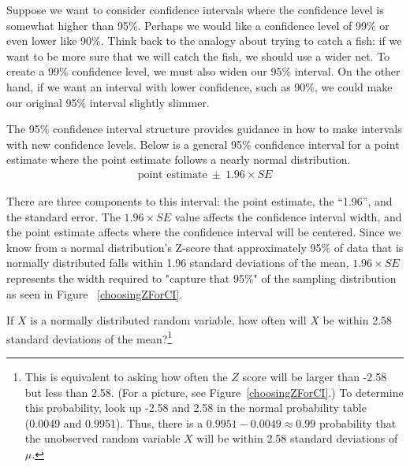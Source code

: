 
Suppose we want to consider confidence intervals where the confidence level is somewhat higher than 95\%. Perhaps we would like a confidence level of 99\% or even lower like 90\%. Think back to the analogy about trying to catch a fish: if we want to be more sure that we will catch the fish, we should use a wider net. To create a 99\% confidence level, we must also widen our 95\% interval. On the other hand, if we want an interval with lower confidence, such as 90\%, we could make our original 95\% interval slightly slimmer.

The 95\% confidence interval structure provides guidance in how to make intervals with new confidence levels. Below is a general 95\% confidence interval for a point estimate where the point estimate follows a nearly normal distribution.
\begin{eqnarray}
\text{point estimate}\ \pm\ 1.96\times SE
\end{eqnarray}

There are three components to this interval: the point estimate, the ``1.96'', and the standard error.  The $1.96\times SE$ value affects the confidence interval width, and the point estimate affects where the confidence interval will be centered. Since we know from a normal distribution's Z-score that approximately 95\% of data that is normally distributed falls within 1.96 standard deviations of the mean, $1.96\times SE$ represents the width required to "capture that 95\%" of the sampling distribution as seen in Figure ~\ref{choosingZForCI}. 
 
\begin{exercise} \label{leadInForMakingA99PercentCIExercise}
If $X$ is a normally distributed random variable, how often will $X$ be within 2.58 standard deviations of the mean?\footnote{This is equivalent to asking how often the $Z$ score will be larger than -2.58 but less than 2.58. (For a picture, see Figure~\ref{choosingZForCI}.) To determine this probability, look up -2.58 and 2.58 in the normal probability table (0.0049 and 0.9951). Thus, there is a $0.9951-0.0049 \approx 0.99$ probability that the unobserved random variable $X$ will be within 2.58 standard deviations of $\mu$.}
\end{exercise}

